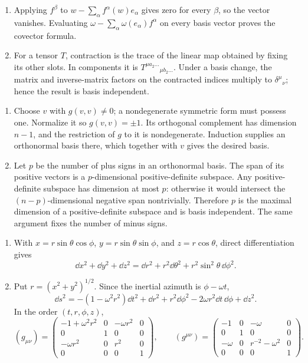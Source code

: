 \begin{enumerate}[leftmargin=2.8em,itemsep=1.2em]
\begin{enumerate}[label=\alph*),leftmargin=2em]
\item Applying \(f^\beta\) to
\(w-\sum_\alpha f^\alpha(w)e_\alpha\) gives zero for every \(\beta\), so the
vector vanishes.  Evaluating
\(\omega-\sum_\alpha\omega(e_\alpha)f^\alpha\) on every basis vector proves
the covector formula.

\item For a tensor \(T\), contraction is the trace of the linear map obtained
by fixing its other slots.  In components it is
\(T^{\mu a_2\ldots}{}_{\mu b_2\ldots}\).  Under a basis change, the matrix and
inverse-matrix factors on the contracted indices multiply to
\(\delta^\mu{}_{\nu}\); hence the result is basis independent.
\end{enumerate}

\begin{enumerate}[label=\alph*),leftmargin=2em]
\item Choose \(v\) with \(g(v,v)\ne0\); a nondegenerate symmetric form must
possess one.  Normalize it so \(g(v,v)=\pm1\).  Its orthogonal complement has
dimension \(n-1\), and the restriction of \(g\) to it is nondegenerate.
Induction supplies an orthonormal basis there, which together with \(v\)
gives the desired basis.

\item Let \(p\) be the number of plus signs in an orthonormal basis.  The span
of its positive vectors is a \(p\)-dimensional positive-definite subspace.
Any positive-definite subspace has dimension at most \(p\): otherwise it
would intersect the \((n-p)\)-dimensional negative span nontrivially.
Therefore \(p\) is the maximal dimension of a positive-definite subspace and
is basis independent.  The same argument fixes the number of minus signs.
\end{enumerate}

\begin{enumerate}[label=\alph*),leftmargin=2em]
\item With
\(x=r\sin\theta\cos\phi\), \(y=r\sin\theta\sin\phi\), and
\(z=r\cos\theta\), direct differentiation gives
\[
 \dd x^2+\dd y^2+\dd z^2
 =\dd r^2+r^2\dd\theta^2+r^2\sin^2\theta\,\dd\phi^2.
\]

\item Put \(r=(x^2+y^2)^{1/2}\).  Since the inertial azimuth is
\(\phi-\omega t\),
\[
 \dd s^2=-(1-\omega^2r^2)\dd t^2+\dd r^2+r^2\dd\phi^2
 -2\omega r^2\dd t\,\dd\phi+\dd z^2.
\]
In the order \((t,r,\phi,z)\),
\[
 (g_{\mu\nu})=
 \begin{pmatrix}
 -1+\omega^2r^2&0&-\omega r^2&0\\
 0&1&0&0\\
 -\omega r^2&0&r^2&0\\
 0&0&0&1
 \end{pmatrix},\qquad
 (g^{\mu\nu})=
 \begin{pmatrix}
 -1&0&-\omega&0\\
 0&1&0&0\\
 -\omega&0&r^{-2}-\omega^2&0\\
 0&0&0&1
 \end{pmatrix}.
\]
\end{enumerate}
\end{enumerate}
